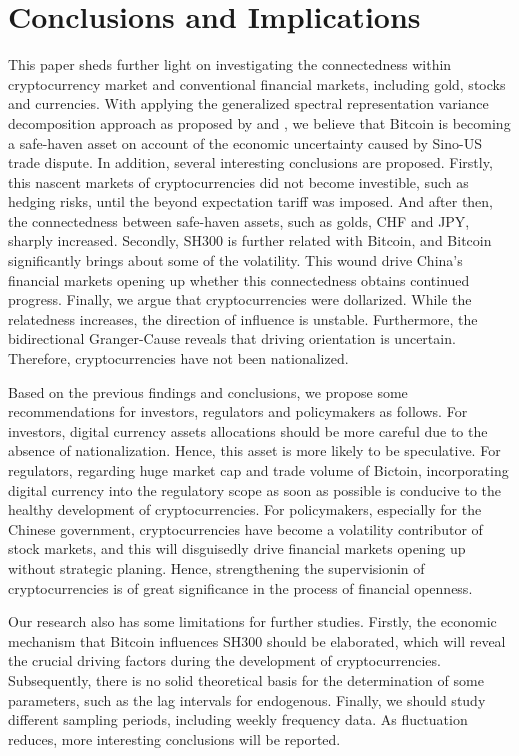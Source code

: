 \documentclass[review]{elsarticle}
\begin{document}
\section{Conclusions and Implications}
This paper sheds further light on investigating the connectedness within cryptocurrency market and conventional financial markets, including gold, stocks and currencies. With applying the generalized spectral representation variance decomposition approach as proposed by \cite{Diebold2012} and \cite{Bariviera2017}, we believe that Bitcoin is becoming a safe-haven asset on account of the economic uncertainty caused by Sino-US trade dispute. In addition, several interesting conclusions are proposed. Firstly, this nascent markets of cryptocurrencies did not become investible, such as hedging risks, until the beyond expectation tariff was imposed. And after then, the connectedness between safe-haven assets, such as golds, CHF and JPY, sharply increased. Secondly, SH300 is further related with Bitcoin, and Bitcoin significantly brings about some of the volatility. This wound drive China's financial markets opening up whether this connectedness obtains continued progress. Finally, we argue that cryptocurrencies were dollarized. While the relatedness increases, the direction of influence is unstable. Furthermore, the bidirectional Granger-Cause reveals that driving orientation is uncertain. Therefore, cryptocurrencies have not been nationalized.


Based on the previous findings and conclusions, we propose some recommendations for investors,  regulators and policymakers as follows. For investors, digital currency assets allocations should be more careful due to the absence of nationalization. Hence, this asset is more likely to be speculative. For regulators, regarding huge market cap and trade volume of Bictoin, incorporating digital currency into the regulatory scope as soon as possible is conducive to the healthy development of cryptocurrencies. For policymakers, especially for the Chinese government, cryptocurrencies have become a volatility contributor of stock markets, and this will disguisedly drive financial markets opening up without strategic planing. Hence, strengthening the supervisionin of cryptocurrencies is of great significance in the process of financial openness.


Our research also has some limitations for further studies. Firstly, the economic mechanism that Bitcoin influences SH300 should be elaborated, which will reveal the crucial driving factors during the development of cryptocurrencies. Subsequently, there is no solid theoretical basis for the determination of some parameters, such as the lag intervals for endogenous. Finally, we should study different sampling periods, including weekly frequency data. As fluctuation reduces, more interesting conclusions will be reported.



\end{document}
